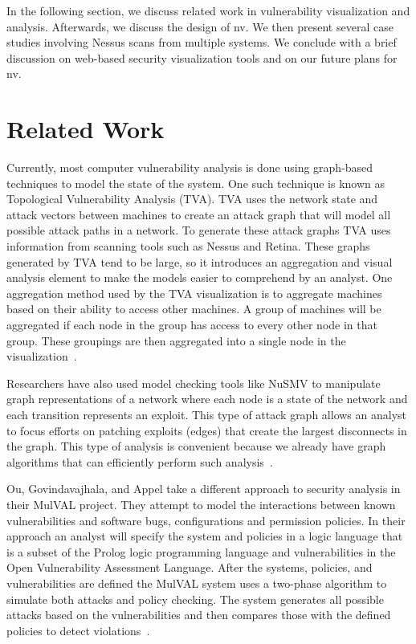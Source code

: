 \documentclass{acm_proc_article-sp}
\begin{document}
In the following section, we discuss related work in vulnerability visualization and analysis. Afterwards, we discuss the design of nv. We then present several case studies involving Nessus scans from multiple systems. We conclude with a brief discussion on web-based security visualization tools and on our future plans for nv.

\section{Related Work}

Currently, most computer vulnerability analysis is done using graph-based
techniques to model the state of the system. One such technique is known as
Topological Vulnerability Analysis (TVA). TVA uses the network state and attack
vectors between machines to create an attack graph that will model all possible attack paths in a
network. To generate these attack graphs TVA uses information from scanning
tools such as Nessus and Retina. These graphs generated by TVA tend to be 
large, so it introduces an aggregation and visual analysis element to make the
models easier to comprehend by an analyst. One aggregation method used by the TVA
visualization is to aggregate machines based on their ability to access other machines. A group of
machines will be aggregated if each node in the group has access to every other
node in that group.
These groupings are then aggregated into a single node in the visualization~\cite{Noel:2009bu}.

Researchers have also used model checking tools like NuSMV to manipulate graph
representations of a network where each node is a state of the network and each
transition represents an exploit.  This type of attack graph allows an analyst
to focus efforts on patching exploits (edges) that create the largest
disconnects in the graph. This type of analysis is convenient because we
already have graph algorithms that can efficiently perform such analysis~\cite{Ammann:2002ty}.

Ou, Govindavajhala, and Appel take a different approach to security analysis in
their MulVAL project.
They attempt to model the interactions between known vulnerabilities and
software bugs, configurations and permission policies.  In their approach an
analyst will specify the system and policies in a logic language that is a subset of the
Prolog logic programming language and vulnerabilities in the Open Vulnerability
Assessment Language. After the systems, policies, and vulnerabilities are defined
the MulVAL system uses a two-phase algorithm to simulate both attacks and policy
checking. The system generates all possible attacks based on the
vulnerabilities and then compares those with the defined policies to detect
violations~\cite{Ou:2005:MLN:1251398.1251406}.
\end{document}
